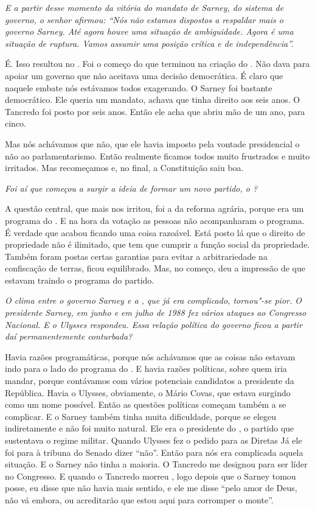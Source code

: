 \medskip

\noindent\emph{E a partir desse momento da vitória do mandato de Sarney, do
sistema de governo, o senhor afirmou: ``Nós não estamos dispostos a
respaldar mais o governo Sarney. Até agora houve uma situação de
ambiguidade. Agora é uma situação de ruptura. Vamos assumir uma posição
crítica e de independência''.}

É. Isso resultou no . Foi o começo do que terminou na
criação do . Não dava para apoiar um governo que não aceitava uma
decisão democrática. É claro que naquele embate nós estávamos todos
exagerando. O Sarney foi bastante democrático. Ele queria um mandato,
achava que tinha direito aos seis anos. O Tancredo foi posto por seis
anos. Então ele acha que abriu mão de um ano, para cinco.

Mas nós achávamos que não, que ele havia imposto pela vontade
presidencial o não ao parlamentarismo. Então realmente ficamos todos
muito frustrados e muito irritados. Mas recomeçamos e, no final, a
Constituição saiu boa.

\medskip

\noindent\emph{Foi aí que começou a surgir a ideia de formar um novo partido, o
?}

A questão central, que mais nos irritou, foi a da reforma
agrária, porque era um programa do . E na hora da votação as pessoas
não acompanharam o programa. É verdade que acabou ficando uma coisa
razoável. Está posto lá que o direito de propriedade não é ilimitado,
que tem que cumprir a função social da propriedade. Também foram postas
certas garantias para evitar a arbitrariedade na confiscação de terras,
ficou equilibrado. Mas, no começo, deu a impressão de que estavam
traindo o programa do partido.

\medskip

\noindent\emph{O clima entre o governo Sarney e a , que já era complicado,
tornou"-se pior. O presidente Sarney, em junho e em julho de 1988 fez
vários ataques ao Congresso Nacional. E o Ulysses respondeu. Essa
relação política do governo ficou a partir daí permanentemente
conturbada?}

Havia razões programáticas, porque nós achávamos que as
coisas não estavam indo para o lado do programa do . E havia razões
políticas, sobre quem iria mandar, porque contávamos com vários
potenciais candidatos a presidente da República. Havia o Ulysses,
obviamente, o Mário Covas, que estava surgindo como um nome possível.
Então as questões políticas começam também a se complicar. E o Sarney
também tinha muita dificuldade, porque se elegeu indiretamente e não foi
muito natural. Ele era o presidente do , o partido que sustentava o
regime militar. Quando Ulysses fez o pedido para as Diretas Já ele foi
para à tribuna do Senado dizer ``não''. Então para nós era complicada
aquela situação. E o Sarney não tinha a maioria. O Tancredo me designou
para ser líder no Congresso. E quando o Tancredo morreu , logo depois
que o Sarney tomou posse, eu disse que não havia mais sentido, e ele me
disse ``pelo amor de Deus, não vá embora, ou acreditarão que estou aqui
para corromper o monte''.

